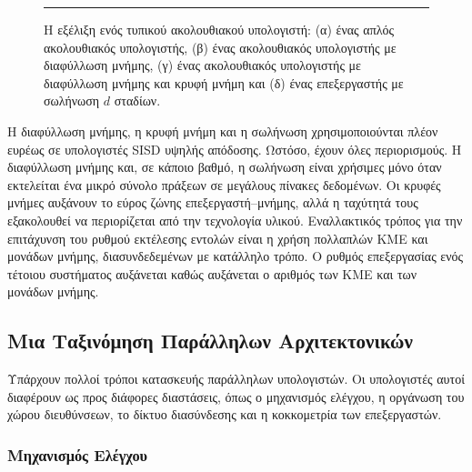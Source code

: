 \documentclass[12pt,a4paper]{article}
\begin{document}
\begin{figure}[H]
\noindent\rule{\textwidth}{0.2pt}
\caption{Η εξέλιξη ενός τυπικού ακολουθιακού υπολογιστή:
(α) ένας απλός ακολουθιακός υπολογιστής, (β) ένας ακολουθιακός υπολογιστής με
διαφύλλωση μνήμης, (γ) ένας ακολουθιακός υπολογιστής με διαφύλλωση μνήμης και
κρυφή μνήμη και (δ) ένας επεξεργαστής με σωλήνωση $d$ σταδίων.}
\label{fig:graph28}
\end{figure}
\vspace{0.3cm}

Η διαφύλλωση μνήμης, η κρυφή μνήμη και η
σωλήνωση χρησιμοποιούνται πλέον ευρέως σε υπολογιστές \foreignlanguage{english}{SISD} υψηλής
απόδοσης. Ωστόσο, έχουν όλες περιορισμούς. Η διαφύλλωση μνήμης και, σε κάποιο
βαθμό, η σωλήνωση είναι χρήσιμες μόνο όταν εκτελείται ένα μικρό σύνολο πράξεων σε
μεγάλους πίνακες δεδομένων. Οι κρυφές μνήμες αυξάνουν το εύρος ζώνης
επεξεργαστή--μνήμης, αλλά η ταχύτητά τους εξακολουθεί να περιορίζεται από την
τεχνολογία υλικού. Εναλλακτικός τρόπος για την επιτάχυνση του ρυθμού εκτέλεσης
εντολών είναι η χρήση πολλαπλών ΚΜΕ και μονάδων μνήμης, διασυνδεδεμένων με
κατάλληλο τρόπο. Ο ρυθμός επεξεργασίας ενός τέτοιου συστήματος αυξάνεται καθώς
αυξάνεται ο αριθμός των ΚΜΕ και των μονάδων μνήμης.

\subsection{Μια Ταξινόμηση Παράλληλων Αρχιτεκτονικών}

Υπάρχουν πολλοί τρόποι κατασκευής παράλληλων υπολογιστών. Οι υπολογιστές αυτοί
διαφέρουν ως προς διάφορες διαστάσεις, όπως ο μηχανισμός ελέγχου, η οργάνωση του
χώρου διευθύνσεων, το δίκτυο διασύνδεσης και η κοκκομετρία των επεξεργαστών.

\subsubsection{Μηχανισμός Ελέγχου}
\end{document}
